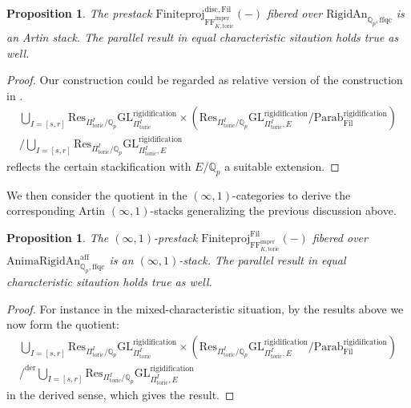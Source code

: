 \documentclass[12pt]{article}
\newtheorem{proposition}[theorem]{Proposition}
\theoremstyle{definition}
\numberwithin{equation}{section}
\begin{document}
\begin{proposition}
The prestack $\mathrm{Finiteproj}^{\mathrm{disc},\mathrm{Fil}}_{\mathrm{FF}^\mathrm{imper}_{K,\mathrm{toric}}}(-)$ fibered over $\mathrm{RigidAn}_{\mathbb{Q}_p,\mathrm{ffqc}}$ is an Artin stack. The parallel result in equal characteristic sitaution holds true as well.	
\end{proposition}

\begin{proof}
Our construction could be regarded as relative version of the construction in \cite[Section 4.1]{He1}. 
\begin{align}
\bigcup_{I=[s,r]}\mathrm{Res}_{\Pi^I_\mathrm{toric}/\mathbb{Q}_p}\mathrm{GL}^\mathrm{rigidification}_{\Pi^I_\mathrm{toric}}\times \left(\mathrm{Res}_{\Pi^I_\mathrm{toric}/\mathbb{Q}_p}\mathrm{GL}^\mathrm{rigidification}_{\Pi^I_\mathrm{toric},E}/\mathrm{Parab}^\mathrm{rigidification}_\mathrm{Fil}\right)\\
/\bigcup_{I=[s,r]}\mathrm{Res}_{\Pi^I_\mathrm{toric}/\mathbb{Q}_p}\mathrm{GL}^\mathrm{rigidification}_{\Pi^I_\mathrm{toric},E}
\end{align}
reflects the certain stackification with $E/\mathbb{Q}_p$ a suitable extension.
\end{proof}



\indent We then consider the quotient in the $(\infty,1)$-categories to derive the corresponding Artin $(\infty,1)$-stacks generalizing the previous discussion above. 



\begin{proposition}
The $(\infty,1)$-prestack $\mathrm{Finiteproj}^{\mathrm{Fil}}_{\mathrm{FF}^\mathrm{imper}_{K,\mathrm{toric}}}(-)$ fibered over $\mathrm{AnimaRigidAn}^\mathrm{aff}_{\mathbb{Q}_p,\mathrm{ffqc}}$ is an $(\infty,1)$-stack. The parallel result in equal characteristic sitaution holds true as well.	
\end{proposition}
 
\begin{proof}
For instance in the mixed-characteristic situation, by the results above we now form the quotient:
\begin{align}
\bigcup_{I=[s,r]}\mathrm{Res}_{\Pi^I_\mathrm{toric}/\mathbb{Q}_p}\mathrm{GL}^\mathrm{rigidification}_{\Pi^I_\mathrm{toric}}\times \left(\mathrm{Res}_{\Pi^I_\mathrm{toric}/\mathbb{Q}_p}\mathrm{GL}^\mathrm{rigidification}_{\Pi^I_\mathrm{toric},E}/\mathrm{Parab}^\mathrm{rigidification}_\mathrm{Fil}\right)\\
/^\mathrm{der}\bigcup_{I=[s,r]}\mathrm{Res}_{\Pi^I_\mathrm{toric}/\mathbb{Q}_p}\mathrm{GL}^\mathrm{rigidification}_{\Pi^I_\mathrm{toric},E}
\end{align}	
in the derived sense, which gives the result.
\end{proof}
\end{document}

